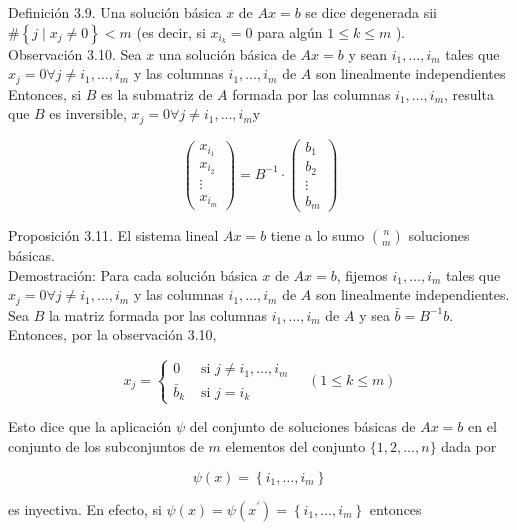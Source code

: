 \documentclass[10pt]{article}
\begin{document}
Definición 3.9. Una solución básica $x$ de $A x=b$ se dice degenerada sii $\#\left\{j \mid x_{j} \neq 0\right\}<m$ (es decir, si $x_{i_{k}}=0$ para algún $1 \leq k \leq m$ ).\\
Observación 3.10. Sea $x$ una solución básica de $A x=b$ y sean $i_{1}, \ldots, i_{m}$ tales que $x_{j}=0 \forall j \neq i_{1}, \ldots, i_{m}$ y las columnas $i_{1}, \ldots, i_{m}$ de $A$ son linealmente independientes Entonces, si $B$ es la submatriz de $A$ formada por las columnas $i_{1}, \ldots, i_{m}$, resulta que $B$ es inversible, $x_{j}=0 \forall j \neq i_{1}, \ldots, i_{m} \mathrm{y}$

$$
\left(\begin{array}{c}
x_{i_{1}} \\
x_{i_{2}} \\
\vdots \\
x_{i_{m}}
\end{array}\right)=B^{-1} \cdot\left(\begin{array}{c}
b_{1} \\
b_{2} \\
\vdots \\
b_{m}
\end{array}\right)
$$

Proposición 3.11. El sistema lineal $A x=b$ tiene a lo sumo $\binom{n}{m}$ soluciones básicas.\\
Demostración: Para cada solución básica $x$ de $A x=b$, fijemos $i_{1}, \ldots, i_{m}$ tales que $x_{j}=0 \forall j \neq i_{1}, \ldots, i_{m}$ y las columnas $i_{1}, \ldots, i_{m}$ de $A$ son linealmente independientes.\\
Sea $B$ la matriz formada por las columnas $i_{1}, \ldots, i_{m}$ de $A$ y sea $\bar{b}=B^{-1} b$. Entonces, por la observación 3.10,

$$
x_{j}=\left\{\begin{array}{ll}
0 & \text { si } j \neq i_{1}, \ldots, i_{m} \\
\bar{b}_{k} & \text { si } j=i_{k}
\end{array} \quad(1 \leq k \leq m)\right.
$$

Esto dice que la aplicación $\psi$ del conjunto de soluciones básicas de $A x=b$ en el conjunto de los subconjuntos de $m$ elementos del conjunto $\{1,2, \ldots, n\}$ dada por

$$
\psi(x)=\left\{i_{1}, \ldots, i_{m}\right\}
$$

es inyectiva. En efecto, si $\psi(x)=\psi\left(x^{\prime}\right)=\left\{i_{1}, \ldots, i_{m}\right\}$ entonces
\end{document}
